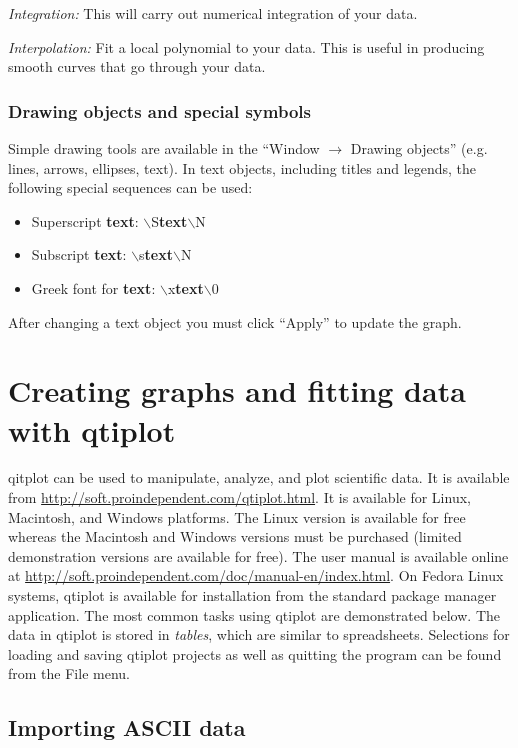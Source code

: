 \documentclass[byrevtex,amssymb,aps,pra,floatfix,letterpaper]{revtex4}
\begin{document}
\noindent
\textit{Integration:} This will carry out numerical integration of your data.

\noindent
\textit{Interpolation:} Fit a local polynomial to your data. This is useful in producing smooth curves that go through your data.

\subsubsection{Drawing objects and special symbols}

Simple drawing tools are available in the ``Window $\rightarrow$ Drawing objects'' (e.g. lines, arrows, ellipses, text).
In text objects, including titles and legends, the following special sequences can be used:

\begin{itemize}
\item Superscript \textbf{text}: $\backslash$S\textbf{text}$\backslash$N
\item Subscript \textbf{text}: $\backslash$s\textbf{text}$\backslash$N
\item Greek font for \textbf{text}: $\backslash$x\textbf{text}$\backslash$0
\end{itemize}

\noindent
After changing a text object you must click ``Apply'' to update the graph.

\section{Creating graphs and fitting data with qtiplot}

qitplot can be used to manipulate, analyze, and plot scientific data. It is available from \url{http://soft.proindependent.com/qtiplot.html}. It is available for Linux, Macintosh, and Windows platforms. The Linux version is available for free whereas the Macintosh and Windows versions must be purchased (limited demonstration versions are available for free). The user manual is available online at \url{http://soft.proindependent.com/doc/manual-en/index.html}. On Fedora Linux systems, qtiplot is available for installation from the standard package manager application. The most common tasks using qtiplot are demonstrated below. The data in qtiplot is stored in \textit{tables}, which are similar to spreadsheets. Selections for loading and saving qtiplot projects as well as quitting the program can be found from the File menu.

\subsection{Importing ASCII data}
\end{document}

